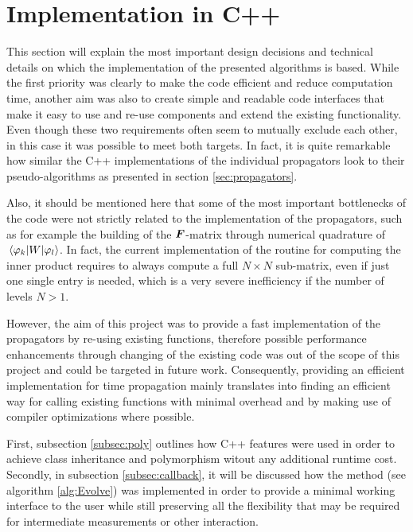 \section{Implementation in C++}
\label{sec:implementation}
%
This section will explain the most important design decisions and technical details on which the implementation of the presented algorithms is based.
While the first priority was clearly to make the code efficient and reduce computation time, another aim was also to create simple and readable code interfaces that make it easy to use and re-use components and extend the existing functionality. \\
%
Even though these two requirements often seem to mutually exclude each other, in this case it was possible to meet both targets.
In fact, it is quite remarkable how similar the C++ implementations of the individual propagators look to their pseudo-algorithms as presented in section \ref{sec:propagators}.
\par\medskip
%
Also, it should be mentioned here that some of the most important bottlenecks of the code were not strictly related to the implementation of the propagators, such as for example the building of the $\bm{F}$-matrix through numerical quadrature of $\matrixel{\varphi_k}{W}{\varphi_l}$.
In fact, the current implementation of the  routine for computing the inner product requires to always compute a full $N \times N$ sub-matrix, even if just one single entry is needed, which is a very severe inefficiency if the number of levels $N>1$.
\par\medskip
%
However, the aim of this project was to provide a fast implementation of the propagators by re-using existing functions, therefore possible performance enhancements through changing of the existing code was out of the scope of this project and could be targeted in future work.
Consequently, providing an efficient implementation for time propagation mainly translates into finding an efficient way for calling existing functions with minimal overhead and by making use of compiler optimizations where possible.
\par\medskip
%
First, subsection \ref{subsec:poly} outlines how C++ features were used in order to achieve class inheritance and polymorphism witout any additional runtime cost.
Secondly, in subsection \ref{subsec:callback}, it will be discussed how the  method (see algorithm \ref{alg:Evolve}) was implemented in order to provide a minimal working interface to the user while still preserving all the flexibility that may be required for intermediate measurements or other interaction.
